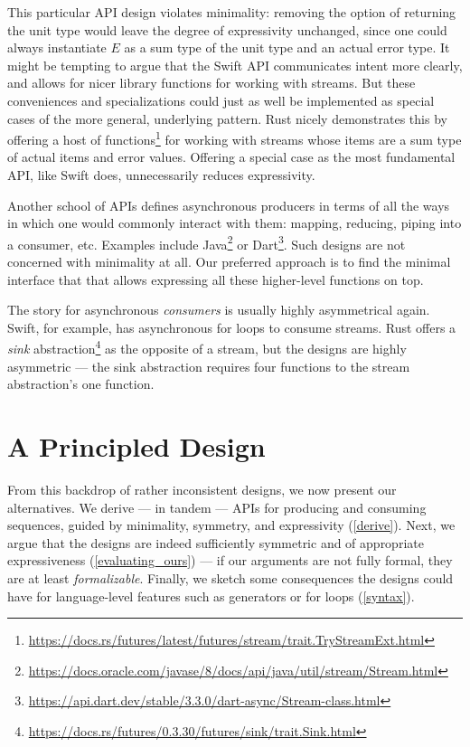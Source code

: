 \documentclass[sigplan,screen,10pt,anonymous,review]{acmart}
\begin{document}
This particular API design violates minimality: removing the option of returning the unit type would leave the degree of expressivity unchanged, since one could always instantiate $E$ as a sum type of the unit type and an actual error type. It might be tempting to argue that the Swift API communicates intent more clearly, and allows for nicer library functions for working with streams. But these conveniences and specializations could just as well be implemented as special cases of the more general, underlying pattern. Rust nicely demonstrates this by offering a host of functions\footnote{\url{https://docs.rs/futures/latest/futures/stream/trait.TryStreamExt.html}} for working with streams whose items are a sum type of actual items and error values. Offering a special case as the most fundamental API, like Swift does, unnecessarily reduces expressivity.

Another school of APIs defines asynchronous producers in terms of all the ways in which one would commonly interact with them: mapping, reducing, piping into a consumer, etc. Examples include Java\footnote{\url{https://docs.oracle.com/javase/8/docs/api/java/util/stream/Stream.html}} or Dart\footnote{\url{https://api.dart.dev/stable/3.3.0/dart-async/Stream-class.html}}. Such designs are not concerned with minimality at all. Our preferred approach is to find the minimal interface that that allows expressing all these higher-level functions on top.

The story for asynchronous \textit{consumers} is usually highly asymmetrical again. Swift, for example, has asynchronous for loops to consume streams. Rust offers a \textit{sink} abstraction\footnote{\url{https://docs.rs/futures/0.3.30/futures/sink/trait.Sink.html}} as the opposite of a stream, but the designs are highly asymmetric --- the sink abstraction requires four functions to the stream abstraction's one function.



\section{A Principled Design}\label{main_design}

From this backdrop of rather inconsistent designs, we now present our alternatives. We derive --- in tandem --- APIs for producing and consuming sequences, guided by minimality, symmetry, and expressivity (\cref{derive}). Next, we argue that the designs are indeed sufficiently symmetric and of appropriate expressiveness (\cref{evaluating_ours}) --- if our arguments are not fully formal, they are at least \textit{formalizable}. Finally, we sketch some consequences the designs could have for language-level features such as generators or for loops (\cref{syntax}).
\end{document}
